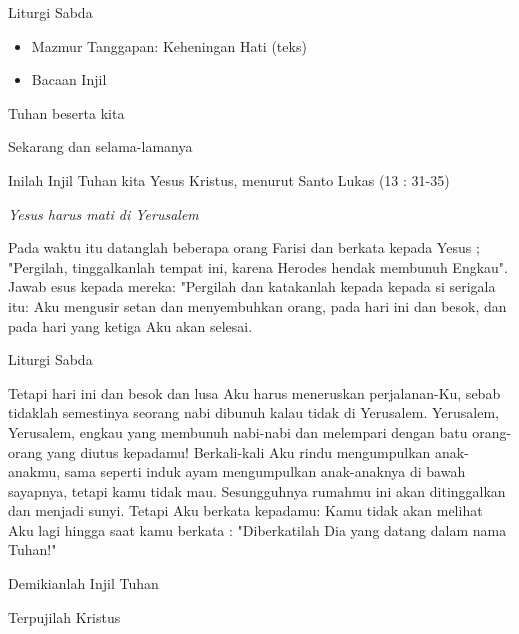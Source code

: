 \documentclass[12pt,a4paper]{beamer}
\begin{document}
\begin{frame}{Liturgi Sabda}
\begin{itemize}
\item Mazmur Tanggapan: Keheningan Hati (teks)
\item Bacaan Injil
\end{itemize}

\begin{description}[1cm]
\item [I]  Tuhan beserta kita 
\item [U]   Sekarang dan selama-lamanya
\item [I]    Inilah Injil Tuhan kita Yesus Kristus, menurut Santo  Lukas (13 : 31-35)

	\textit{Yesus harus mati di Yerusalem}
	
            Pada waktu itu datanglah beberapa orang Farisi dan berkata kepada Yesus ; "Pergilah, tinggalkanlah tempat ini, karena Herodes hendak membunuh Engkau". Jawab esus kepada mereka: "Pergilah dan katakanlah kepada  kepada si serigala itu: Aku mengusir setan dan menyembuhkan orang, pada hari ini dan besok, dan pada hari yang ketiga Aku akan selesai. 
\end{description}

\end{frame}            
\begin{frame}{Liturgi Sabda}
\begin{description}[1cm]
\item Tetapi hari ini dan besok dan lusa Aku harus meneruskan perjalanan-Ku, sebab tidaklah semestinya seorang nabi dibunuh kalau tidak di Yerusalem. Yerusalem, Yerusalem, engkau yang membunuh nabi-nabi dan melempari dengan batu orang-orang yang diutus kepadamu! Berkali-kali Aku rindu mengumpulkan anak-anakmu, sama seperti induk ayam mengumpulkan anak-anaknya di bawah sayapnya, tetapi kamu tidak mau. Sesungguhnya rumahmu ini akan ditinggalkan dan menjadi sunyi. Tetapi Aku berkata kepadamu: Kamu tidak akan melihat Aku lagi hingga saat kamu berkata : "Diberkatilah Dia yang datang dalam nama Tuhan!"

Demikianlah Injil Tuhan

\item [U]    Terpujilah Kristus

\end{description}
\end{frame}
\end{document}
